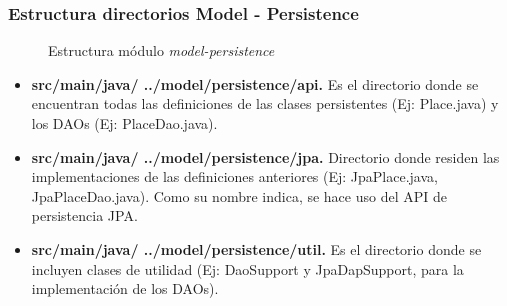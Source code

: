 \subsubsection*{Estructura directorios Model - Persistence}
\begin{figure}[H]
\centering
{}
\caption{Estructura módulo \textit{model-persistence}}
\end{figure}

\begin{itemize}
	\item \textbf{src/main/java/ ../model/persistence/api. } Es el directorio donde se encuentran todas las definiciones de las clases persistentes (Ej: Place.java) y los DAOs (Ej: PlaceDao.java).
	\item \textbf{src/main/java/ ../model/persistence/jpa. } Directorio donde residen las implementaciones de las definiciones anteriores (Ej: JpaPlace.java, JpaPlaceDao.java). Como su nombre indica, se hace uso del API de persistencia JPA. 
	\item \textbf{src/main/java/ ../model/persistence/util. } Es el directorio donde se incluyen clases de utilidad (Ej: DaoSupport y JpaDapSupport, para la implementación de los DAOs).
\end{itemize}

